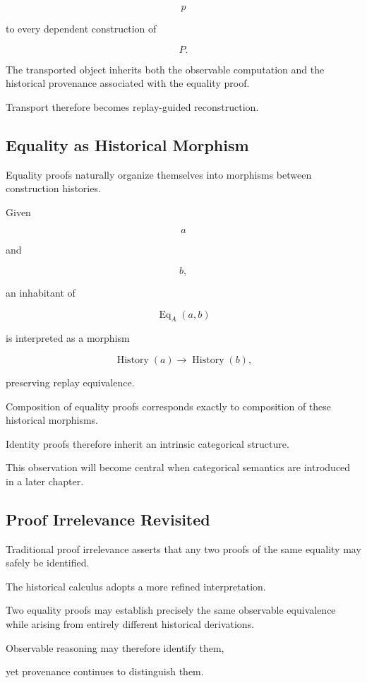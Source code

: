 \documentclass[12pt,oneside]{article}
\theoremstyle{definition}
\theoremstyle{remark}
\DeclareMathOperator{\History}{History}
\begin{document}
\[
p
\]

to every dependent construction of

\[
P.
\]

The transported object inherits both the observable computation and the
historical provenance associated with the equality proof.

Transport therefore becomes replay-guided reconstruction.

\subsection{Equality as Historical Morphism}

Equality proofs naturally organize themselves into morphisms between
construction histories.

Given

\[
a
\]

and

\[
b,
\]

an inhabitant of

\[
\operatorname{Eq}_A(a,b)
\]

is interpreted as a morphism

\[
\History(a)
\longrightarrow
\History(b),
\]

preserving replay equivalence.

Composition of equality proofs corresponds exactly to composition of these
historical morphisms.

Identity proofs therefore inherit an intrinsic categorical structure.

This observation will become central when categorical semantics are introduced
in a later chapter.

\subsection{Proof Irrelevance Revisited}

Traditional proof irrelevance asserts that any two proofs of the same equality
may safely be identified.

The historical calculus adopts a more refined interpretation.

Two equality proofs may establish precisely the same observable equivalence
while arising from entirely different historical derivations.

Observable reasoning may therefore identify them,

yet provenance continues to distinguish them.
\end{document}
